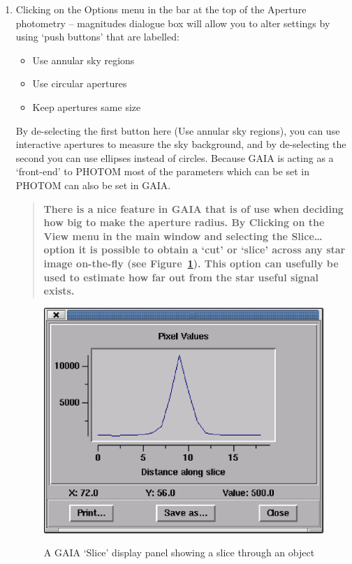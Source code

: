 \documentclass[twoside,11pt]{article}
\begin{document}
\begin{enumerate}
  \item Clicking on the {\sf Options} menu in the bar at the top of the
   {\sf Aperture photometry -- magnitudes} dialogue box will allow you to
   alter settings by using `push buttons' that are labelled:

  \begin{itemize}

     \item {\sf Use annular sky regions}

     \item {\sf Use circular apertures}

     \item {\sf Keep apertures same size}

  \end{itemize}

   By de-selecting the first button here ({\sf Use annular sky
   regions}), you can use interactive apertures to measure the sky
   background, and by de-selecting the second you can use ellipses
   instead of circles.  Because GAIA is acting as a `front-end' to
   PHOTOM most of the parameters which can be set in PHOTOM can also
   be set in GAIA.

  \begin{quote}
   {\bf There is a nice feature in GAIA that is of use when deciding how
   big to make the aperture radius. By Clicking on the {\sf View} menu
   in the main window and selecting the {\sf Slice\ldots} option it is
   possible to obtain a `cut' or `slice' across any star image on-the-fly
   (see Figure~\ref{g6}).  This option can usefully be used to estimate
   how far out from the star useful signal exists.}
  \end{quote}

  \begin{figure}[htbp]
     \centering
     \includegraphics[totalheight=3.25in]{sc6_gaia3.ps}
     \begin{quote}
     \caption[A GAIA `{\sf Slice}' display panel]
      {A GAIA `{\sf Slice}' display panel showing a slice through an object
     \label{g6} }
     \end{quote}
  \end{figure}


\end{enumerate}
\end{document}
